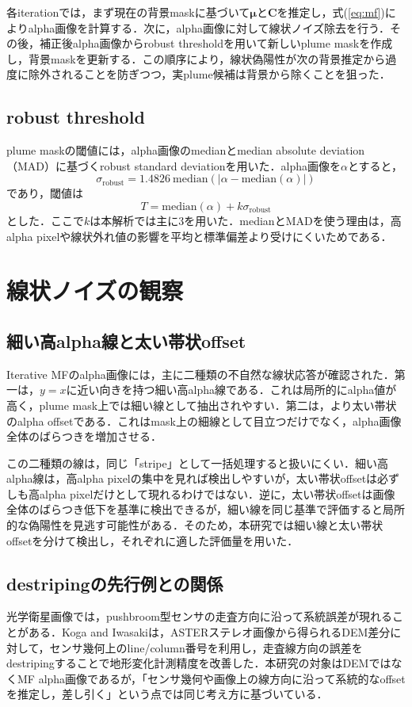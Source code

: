 \documentclass[a4paper,10pt]{ltjsarticle}
\begin{document}
各iterationでは，まず現在の背景maskに基づいて$\boldsymbol{\mu}$と$\mathbf{C}$を推定し，式(\ref{eq:mf})によりalpha画像を計算する．次に，alpha画像に対して線状ノイズ除去を行う．その後，補正後alpha画像からrobust thresholdを用いて新しいplume maskを作成し，背景maskを更新する．この順序により，線状偽陽性が次の背景推定から過度に除外されることを防ぎつつ，実plume候補は背景から除くことを狙った．

\subsection{robust threshold}
plume maskの閾値には，alpha画像のmedianとmedian absolute deviation（MAD）に基づくrobust standard deviationを用いた．alpha画像を$\alpha$とすると，
\begin{equation}
  \sigma_{\mathrm{robust}} =
  1.4826 \ \mathrm{median}\left(|\alpha - \mathrm{median}(\alpha)|\right)
  \label{eq:rstd}
\end{equation}
であり，閾値は
\begin{equation}
  T = \mathrm{median}(\alpha) + k\sigma_{\mathrm{robust}}
  \label{eq:threshold}
\end{equation}
とした．ここで$k$は本解析では主に3を用いた．medianとMADを使う理由は，高alpha pixelや線状外れ値の影響を平均と標準偏差より受けにくいためである．

\section{線状ノイズの観察}
\subsection{細い高alpha線と太い帯状offset}
Iterative MFのalpha画像には，主に二種類の不自然な線状応答が確認された．第一は，$y=x$に近い向きを持つ細い高alpha線である．これは局所的にalpha値が高く，plume mask上では細い線として抽出されやすい．第二は，より太い帯状のalpha offsetである．これはmask上の細線として目立つだけでなく，alpha画像全体のばらつきを増加させる．

この二種類の線は，同じ「stripe」として一括処理すると扱いにくい．細い高alpha線は，高alpha pixelの集中を見れば検出しやすいが，太い帯状offsetは必ずしも高alpha pixelだけとして現れるわけではない．逆に，太い帯状offsetは画像全体のばらつき低下を基準に検出できるが，細い線を同じ基準で評価すると局所的な偽陽性を見逃す可能性がある．そのため，本研究では細い線と太い帯状offsetを分けて検出し，それぞれに適した評価量を用いた．

\subsection{destripingの先行例との関係}
光学衛星画像では，pushbroom型センサの走査方向に沿って系統誤差が現れることがある．Koga and Iwasaki\cite{koga2011}は，ASTERステレオ画像から得られるDEM差分に対して，センサ幾何上のline/column番号を利用し，走査線方向の誤差をdestripingすることで地形変化計測精度を改善した．本研究の対象はDEMではなくMF alpha画像であるが，「センサ幾何や画像上の線方向に沿って系統的なoffsetを推定し，差し引く」という点では同じ考え方に基づいている．
\end{document}
